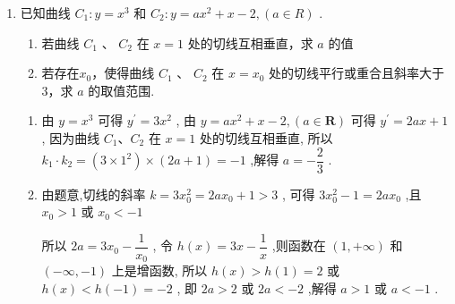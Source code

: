 \begin{enumerate}
\begin{jieda}
\begin{enumerate}
            $f(x) \geq 0$即$-ax^2 + x\leq sinx$
            综上，$a \geq \dfrac{1}{\pi}$
        \end{enumerate}
    \end{jieda}
    
    \item 已知曲线 ${C}_{1} : y = {x}^{3}$ 和 ${C}_{2} : y = a{x}^{2} + x - 2,\left( {a \in  {R}}\right)$ .
    \begin{enumerate}
        \item 若曲线 ${C}_{1}$ 、 ${C}_{2}$ 在 $x = 1$ 处的切线互相垂直，求 $a$ 的值
        \item 若存在$x_0$，使得曲线 ${C}_{1}$ 、 ${C}_{2}$ 在 $x = {x}_{0}$ 处的切线平行或重合且斜率大于 3，求 $a$ 的取值范围.
    \end{enumerate}
    \begin{jieda}
        \begin{enumerate}
            \item 由 $y = {x}^{3}$ 可得 ${y}^{\prime } = 3{x}^{2}$ ,
            由 $y = a{x}^{2} + x - 2,\left( {a \in  \mathbf{R}}\right)$ 可得 ${y}^{\prime } = {2ax} + 1$ ,
            因为曲线 ${C}_{1}\text{、}{C}_{2}$ 在 $x = 1$ 处的切线互相垂直,
            所以 ${k}_{1} \cdot  {k}_{2} = \left( {3 \times  {1}^{2}}\right)  \times  \left( {{2a} + 1}\right)  =  - 1$ ,解得 $a =  - \dfrac{2}{3}$ .
            \item 由题意,切线的斜率 $k = 3{x}_{0}^{2} = {2a}{x}_{0} + 1 > 3$ ,
            可得 $3{x}_{0}^{2} - 1 = {2a}{x}_{0}$ ,且 ${x}_{0} > 1$ 或 ${x}_{0} <  - 1$ 
            
            所以 ${2a} = 3{x}_{0} - \dfrac{1}{{x}_{0}}$ ,
            令 $h\left( x\right)  = {3x} - \dfrac{1}{x}$ ,则函数在 $\left( {1, + \infty }\right)$ 和 $\left( {-\infty , - 1}\right)$ 上是增函数,
            所以 $h\left( x\right)  > h\left( 1\right)  = 2$ 或 $h\left( x\right)  < h\left( {-1}\right)  =  - 2$ ,
            即 ${2a} > 2$ 或 ${2a} <  - 2$ ,解得 $a > 1$ 或 $a <  - 1$ .
        \end{enumerate}
    \end{jieda}
\end{enumerate}
\clearpage

